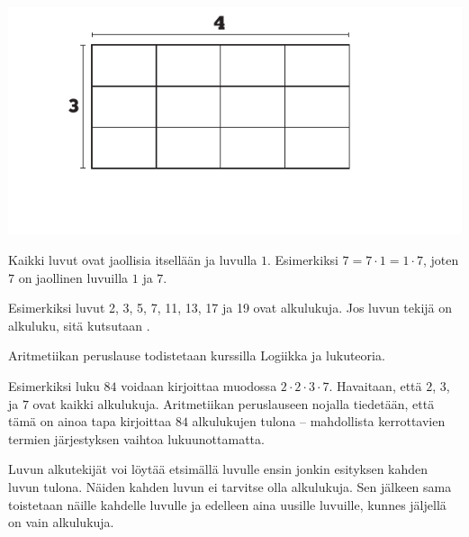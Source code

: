 \begin{center}
\includegraphics[scale=0.85]{pictures/Kuva2-4-3x4.pdf}
\end{center}
    
Kaikki luvut ovat jaollisia itsellään ja luvulla $1$. Esimerkiksi $7=7 \cdot 1=1 \cdot 7$, joten $7$ on jaollinen luvuilla $1$ ja $7$.
    
    
Esimerkiksi luvut 2, 3, 5, 7, 11, 13, 17 ja 19 ovat alkulukuja. Jos luvun tekijä on alkuluku, sitä kutsutaan .
    
    
Aritmetiikan peruslause todistetaan kurssilla Logiikka ja lukuteoria.
    
Esimerkiksi luku $84$ voidaan kirjoittaa muodossa $2\cdot 2\cdot 3\cdot 7$. Havaitaan, että $2$, $3$, ja $7$ ovat kaikki alkulukuja. Aritmetiikan peruslauseen nojalla tiedetään, että tämä on ainoa tapa kirjoittaa $84$ alkulukujen tulona -- mahdollista kerrottavien termien järjestyksen vaihtoa lukuunottamatta.
    
Luvun alkutekijät voi löytää etsimällä luvulle ensin jonkin esityksen kahden luvun tulona. Näiden kahden luvun ei tarvitse olla alkulukuja. Sen jälkeen sama toistetaan näille kahdelle luvulle ja edelleen aina uusille luvuille, kunnes jäljellä on vain alkulukuja.

